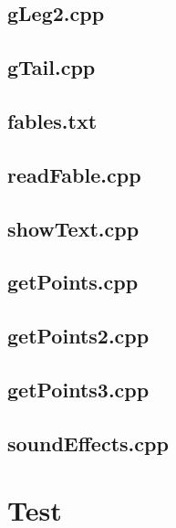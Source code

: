 \documentclass{article}
\begin{document}
\newpage\subsection{gLeg2.cpp}
\newpage\subsection{gTail.cpp}
\newpage\subsection{fables.txt}
\newpage\subsection{readFable.cpp}
\newpage\subsection{showText.cpp}
\newpage\subsection{getPoints.cpp}
\newpage\subsection{getPoints2.cpp}
\newpage\subsection{getPoints3.cpp}
\newpage\subsection{soundEffects.cpp}
\section{Test}
\end{document}
